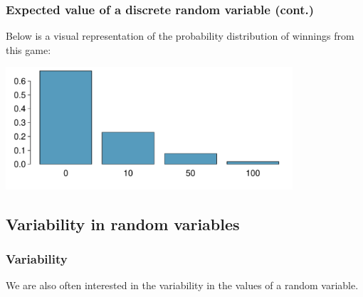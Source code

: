 \documentclass[notes,11pt, aspectratio=169]{beamer}
\begin{document}

\begin{frame}
\frametitle{Expected value of a discrete random variable (cont.)}

Below is a visual representation of the probability distribution of winnings from this game:

\begin{center}
\includegraphics[width=0.8\textwidth]{graphs/l03f07}
\end{center}

\end{frame}


\subsection{Variability in random variables}


\begin{frame}
\frametitle{Variability}

We are also often interested in the variability in the values of a random variable.

\formula{
\[ \sigma^2 = Var(X) = \sum_{i = 1}^k (x_i - E(X))^2 P(X = x_i) \]
\[ \sigma = SD(X) = \sqrt{Var(X)} \]
}

\end{frame}

\end{document}
